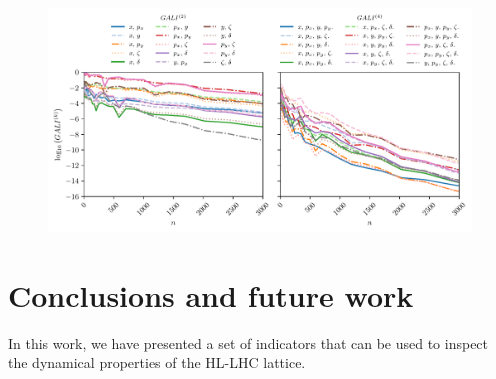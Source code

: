 \begin{figure}
    \centering
    \includegraphics[width=1.0\textwidth]{6_lhc_dynamic_indicators/figs/gali_2_4_chaos.pdf}
    \caption{}
    \label{fig:gali2_4_chaos}
\end{figure}


\section{Conclusions and future work}

In this work, we have presented a set of indicators that can be used to inspect the dynamical properties of the HL-LHC lattice.